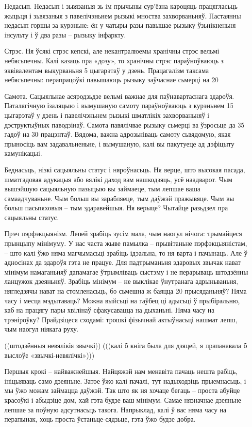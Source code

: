 Недасып. Недасып і зьвязаныя зь ім прычыны сур'ёзна кароцяць працягласьць жыцьця і зьвязаныя з павелічэньнем рызыкі мноства захворваньняў. Пастаянны недасып горшы за курэньне: ён у чатыры разы павышае рызыку ўзьнікненьня інсульту і ў два разы – рызыку інфаркту.

Стрэс. Ня ўсякі стрэс кепскі, але некантралюемы хранічны стрэс вельмі небясьпечны. Калі казаць пра «дозу», то хранічны стрэс параўноўваюць з эквівалентам выкурваньня 5 цыгарэтаў у дзень. Працагалізм таксама небясьпечны: перапрацоўкі павышаюць рызыку заўчаснае сьмерці на 20%

Самота. Сацыяльнае асяродзьдзе вельмі важнае для паўнавартаснага здароўя. Паталягічную ізаляцыю і вымушаную самоту параўноўваюць з курэньнем 15 цыгарэтаў у дзень і павелічэньнем рызыкі шматлікіх захворваньняў і дэструктыўных паводзінаў. Самота павялічвае рызыку сьмерці ва ўзросьце да 35 гадоў на 30 працэнтаў. Вядома, важна адрозьніваць самоту сьвядомую, якая прыносіць вам задавальненьне, і вымушаную, калі вы пакутуеце ад дэфіцыту камунікацыі.

Беднасьць, нізкі сацыяльны статус і няроўнасьць. Ня верце, што высокая пасада, шматгадовая адукацыя або вялікі даход вам нашкодзяць, усё наадварот. Чым вышэйшую сацыяльную пазыцыю вы займаеце, тым лепшае ваша самаадчуваньне. Чым больш вы зарабляеце, тым даўжэй пражывяце. Чым вы больш пасьпяховыя – тым здаравейшыя. Ня верыце? Чытайце разьдзел пра сацыяльны статус.

Прэч пэрфэкцыянізм. Лепей зрабіць зусім мала, чым наогул нічога: трымайцеся прынцыпу мінімуму. У нас часта жыве памылка – прывітаньне пэрфэкцыяністам, – што калі ўжо няма магчымасьці зрабіць ідэальна, то ня варта і пачынаць. Але ў адносінах да здароўя гэта не працуе. Для падтрыманьня здаровых звычак нават мінімум намаганьняў дапамагае ўтрымліваць сыстэму і не перарываць штодзённы ланцужок дзеяньняў. Зрабіць мінімум – не выклікае ўнутранага адрыньваньня, нягледзячы нават на стомленасьць, бо сьмешна ж баяцца 20 прысяданьняў? Няма часу і месца мэдытаваць? Можна выйсьці на гаўбец ці адысьці ў прыбіральню, каб на працягу пары хвілінаў сфакусавацца на дыханьні. Няма часу на трэніроўку? Прайдзіцеся сходамі: трошкі фізычнай актыўнасьці нашмат лепш, чым наогул ніякага руху.

((штодзённыя невялікія звычкі)) (((калі б кніга была для дзяцей, я прапанавала б выслоўе «звычкі-невялічкі»)))

Першыя крокі – найважнейшыя. Найцяжэй нам менавіта пачаць нешта рабіць, ініцыяваць само дзеяньне. Затое ўжо калі пачалі, тут надыходзіць прыемнасьць, і мы ўжо можам займацца даўжэй. Так што як ня хочаце бегаць – проста абуйце красоўкі і абыдзіце дом, хай гэта будзе ваш мінімум. Самае нязначнае дзеяньне лепшае за поўную адсутнасьць такога. Напрыклад, калі ў вас няма часу на перапынак, хоць проста ўстаньце-сядзьце, гэта ўжо будзе добра.

